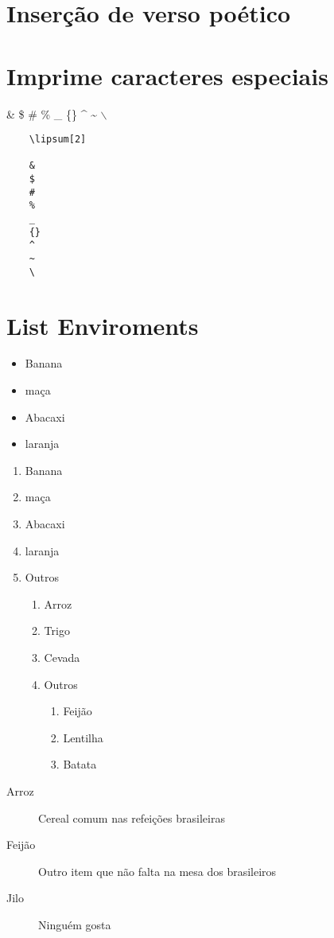 \documentclass[12pt, a4paper]{article}
\begin{document}
\section{Inserção de verso poético}
\lipsum[1]
\begin{verse}
	\lipsum[2]
\end{verse}

\section{Imprime caracteres especiais}
\&
\$
\#
\%
\_
\{\}
\^{}
\~{}
$\backslash$
\begin{verbatim}
	\lipsum[2]
	
	&
	$
	#
	%
	_
	{}
	^
	~
	\

\end{verbatim}

\section{List Enviroments}
\begin{itemize}
	\item Banana
	\item maça
	\item Abacaxi
	\item laranja
\end{itemize}

\begin{enumerate}
	\item Banana
	\item maça
	\item Abacaxi
	\item laranja
	\item Outros
	\begin{enumerate}
		\item Arroz
		\item Trigo
		\item Cevada
		\item Outros
		\begin{enumerate}
			\item Feijão
			\item Lentilha
			\item Batata
		\end{enumerate}
	\end{enumerate} 
\end{enumerate}

\begin{description}
	\item[Arroz] Cereal comum nas refeições brasileiras
	\item[Feijão] Outro item que não falta na mesa dos brasileiros
	\item[Jilo] Ninguém gosta
\end{description}
\end{document}
